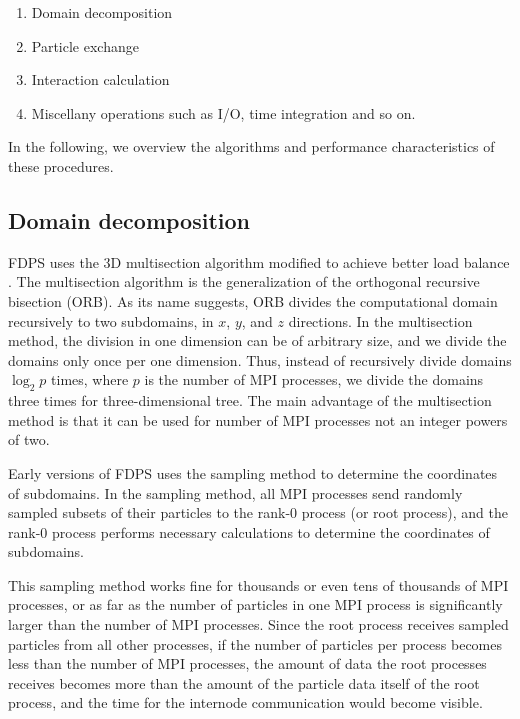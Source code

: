 \begin{enumerate}
  

\item Domain decomposition
\item Particle exchange 
\item Interaction calculation
\item Miscellany operations such as I/O, time integration and so on.
  \end{enumerate}

In the following, we overview the algorithms and performance
characteristics of these procedures.


\subsection{Domain decomposition}
\label{sect:domaindecomposition}
FDPS uses the 3D multisection algorithm \cite{Makino2004} modified to
achieve better load balance \cite{Ishiyamaetal2009b}. The multisection
algorithm is the generalization of the orthogonal recursive bisection (ORB\cite{Salmon1990}). As its name suggests, ORB divides the computational
domain recursively to two subdomains, in $x$, $y$, and $z$
directions. In the multisection method, the division in one dimension can
be of arbitrary size, and we divide the domains only once per one
dimension. Thus, instead of recursively divide domains $\log_2 p$ times,
where $p$ is the number of MPI processes, we divide the domains three
times for three-dimensional tree. The main advantage of the
multisection method is that it can be used for number of MPI processes
not an integer powers of two.

Early versions of FDPS uses the sampling method
\cite{BlackstonSuel1997} to determine the coordinates of
subdomains. In the sampling method, all MPI processes send randomly
sampled subsets of their particles to the rank-0 process (or root
process), and the rank-0
process performs necessary calculations to determine the coordinates of
subdomains.

This sampling method works fine for thousands or even tens of
thousands of MPI processes, or  as far as the number of particles in
one MPI process is significantly larger than the number of MPI
processes. Since the root process receives sampled particles from all
other processes, if the number of particles per process becomes less
than the number of MPI processes, the amount of data the root
processes receives becomes more than the amount of the particle data
itself of the root process, and the time for the internode
communication would become visible.

